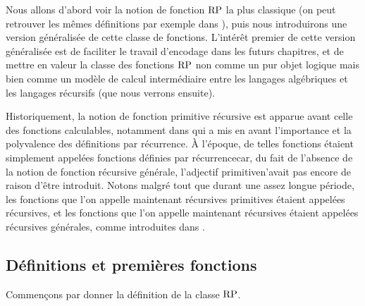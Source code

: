 Nous allons d'abord voir la notion de fonction $\operatorname{RP}$ la plus classique (on
peut retrouver les mêmes définitions par exemple dans \cite{Cori2020}),
puis nous introduirons une version généralisée de cette classe de fonctions.
L'intérêt premier de cette version généralisée est de faciliter le travail
d'encodage dans les futurs chapitres, et de mettre en valeur la classe des
fonctions $\operatorname{RP}$ non comme un pur objet logique mais bien comme un modèle de
calcul intermédiaire entre les langages algébriques et les langages récursifs
(que nous verrons ensuite).

Historiquement, la notion de fonction primitive récursive est apparue avant
celle des fonctions calculables, notamment dans \cite{Skolem1923} qui
a mis en avant l'importance et la polyvalence des définitions par récurrence.
\`A l'époque, de telles fonctions étaient simplement appelées \og fonctions
définies par récurrence\fg car, du fait de l'absence de la notion de fonction
récursive générale, l'adjectif \og primitive\fg n'avait pas encore de raison
d'être introduit. Notons malgré tout que durant une assez longue période, les
fonctions que l'on appelle maintenant récursives primitives étaient appelées
récursives, et les fonctions que l'on appelle maintenant récursives étaient
appelées récursives générales, comme introduites dans
\cite{Goedel1934}.

\subsection{Définitions et premières fonctions}

\noindent
Commençons par donner la définition de la classe $\operatorname{RP}$.

